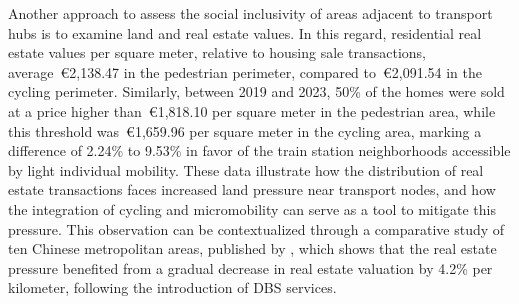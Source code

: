 \begin{refsegment}
Another approach to assess the social inclusivity of areas adjacent to transport hubs is to examine land and real estate values. In this regard, residential real estate values per square meter, relative to housing sale transactions, average~\euro2,138.47 in the pedestrian perimeter, compared to~\euro2,091.54 in the cycling perimeter. Similarly, between 2019 and 2023, 50\% of the homes were sold at a price higher than~\euro1,818.10 per square meter in the pedestrian area, while this threshold was~\euro1,659.96 per square meter in the cycling area, marking a difference of 2.24\% to 9.53\% in favor of the train station neighborhoods accessible by light individual mobility. These data illustrate how the distribution of real estate transactions faces increased land pressure near transport nodes, and how the integration of cycling and micromobility can serve as a tool to mitigate this pressure. This observation can be contextualized through a comparative study of ten Chinese metropolitan areas, published by \textcolor{blue}{\textcite[10]{chu_last_2021}}, which shows that the real estate pressure benefited from a gradual decrease in real estate valuation by 4.2\% per kilometer, following the introduction of \acrshort{DBS} services.%
    

\end{refsegment}
